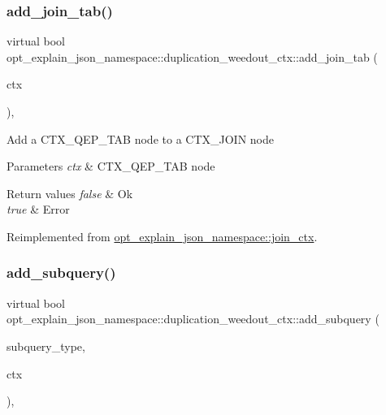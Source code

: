 \subsubsection{\texorpdfstring{add\+\_\+join\+\_\+tab()}{add\_join\_tab()}}
{\footnotesize\ttfamily virtual bool opt\+\_\+explain\+\_\+json\+\_\+namespace\+::duplication\+\_\+weedout\+\_\+ctx\+::add\+\_\+join\+\_\+tab (\begin{DoxyParamCaption}\item[{\mbox{\hyperlink{classopt__explain__json__namespace_1_1joinable__ctx}{joinable\+\_\+ctx}} $\ast$}]{ctx }\end{DoxyParamCaption})\hspace{0.3cm}{\ttfamily [inline]}, {\ttfamily [virtual]}}

Add a C\+T\+X\+\_\+\+Q\+E\+P\+\_\+\+T\+AB node to a C\+T\+X\+\_\+\+J\+O\+IN node


\begin{DoxyParams}{Parameters}
{\em ctx} & C\+T\+X\+\_\+\+Q\+E\+P\+\_\+\+T\+AB node\\
\hline
\end{DoxyParams}

\begin{DoxyRetVals}{Return values}
{\em false} & Ok \\
\hline
{\em true} & Error \\
\hline
\end{DoxyRetVals}


Reimplemented from \mbox{\hyperlink{classopt__explain__json__namespace_1_1join__ctx_a2eec52e554d339b5f45630e7f8cf5d41}{opt\+\_\+explain\+\_\+json\+\_\+namespace\+::join\+\_\+ctx}}.

\mbox{\label{classopt__explain__json__namespace_1_1duplication__weedout__ctx_a2b570476015c26f58d8b7ec13cc11b4d}} 
\subsubsection{\texorpdfstring{add\+\_\+subquery()}{add\_subquery()}}
{\footnotesize\ttfamily virtual bool opt\+\_\+explain\+\_\+json\+\_\+namespace\+::duplication\+\_\+weedout\+\_\+ctx\+::add\+\_\+subquery (\begin{DoxyParamCaption}\item[{subquery\+\_\+list\+\_\+enum}]{subquery\+\_\+type,  }\item[{\mbox{\hyperlink{classopt__explain__json__namespace_1_1subquery__ctx}{subquery\+\_\+ctx}} $\ast$}]{ctx }\end{DoxyParamCaption})\hspace{0.3cm}{\ttfamily [inline]}, {\ttfamily [virtual]}}

